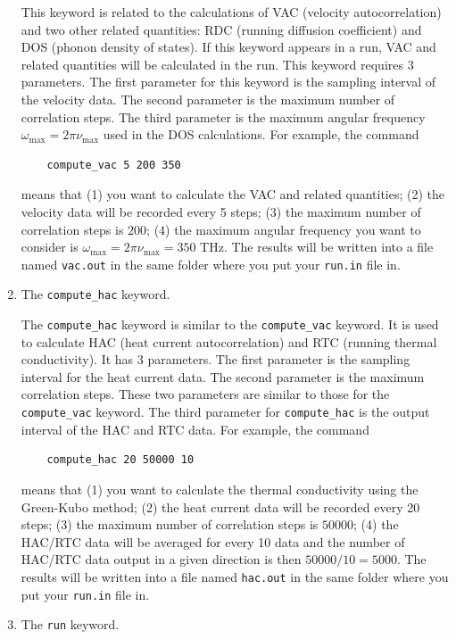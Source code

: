 \documentclass[12pt,a4paper]{report}
\begin{document}
\begin{enumerate}
This keyword is related to the calculations of VAC (velocity autocorrelation) and two other related quantities: RDC (running diffusion coefficient) and DOS (phonon density of states).
If this keyword appears in a run, VAC and related quantities will be calculated in the run. This keyword requires 3 parameters.
The first parameter for this keyword is the sampling interval of the velocity data. The second parameter is the maximum number of correlation steps. The third parameter is the maximum angular frequency $\omega_{\text{max}}=2\pi \nu_{\text{max}}$ used in the DOS calculations. For example, the command
\begin{verbatim}
    compute_vac 5 200 350
\end{verbatim}
means that (1) you want to calculate the VAC and related quantities; (2) the velocity data will be recorded every 5 steps; (3) the maximum number of correlation steps is $200$; (4) the maximum angular frequency you want to consider is $\omega_{\text{max}}=2\pi \nu_{\text{max}}= 350$ THz. The results will be written into a file named \verb"vac.out" in the same folder where you put your \verb"run.in" file in.


\item The \verb"compute_hac" keyword.

The \verb"compute_hac" keyword is similar to the \verb"compute_vac" keyword. It is used to calculate HAC (heat current autocorrelation) and RTC (running thermal conductivity).
It has 3 parameters. The first parameter is the sampling interval for the heat current data. The second parameter is the maximum correlation steps. These two parameters are similar to those for the \verb"compute_vac" keyword. The third parameter for \verb"compute_hac" is the output interval of the HAC and RTC data. For example, the command
\begin{verbatim}
    compute_hac 20 50000 10
\end{verbatim}
means that (1) you want to calculate the thermal conductivity using the Green-Kubo method; (2) the heat current data will be recorded every 20 steps; (3) the maximum number of correlation steps is $50000$; (4) the HAC/RTC data will be averaged for every 10 data and the number of HAC/RTC data output in a given direction is then $50000/10=5000$. The results will be written into a file named \verb"hac.out" in the same folder where you put your \verb"run.in" file in.

\item The \verb"run" keyword.


\end{enumerate}
\end{document}
